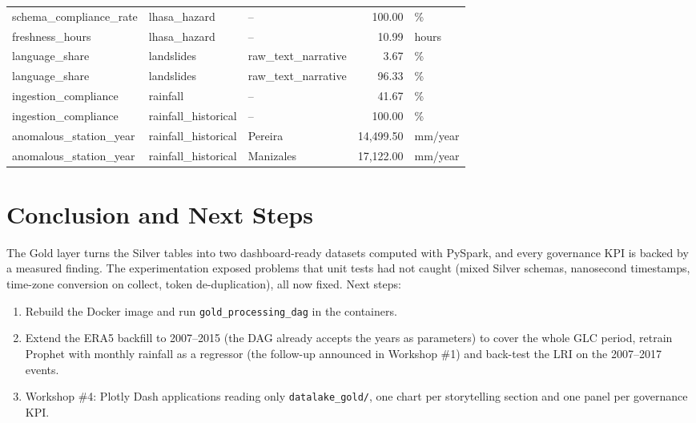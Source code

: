 \documentclass[11pt,a4paper]{article}
\begin{document}
\begin{longtable}{p{4.0cm}p{3.0cm}p{3.8cm}rp{1.4cm}}
schema\_compliance\_rate & lhasa\_hazard & -- & 100.00 & \% \\
freshness\_hours & lhasa\_hazard & -- & 10.99 & hours \\
language\_share & landslides & raw\_text\_narrative & 3.67 & \% \\
language\_share & landslides & raw\_text\_narrative & 96.33 & \% \\
ingestion\_compliance & rainfall & -- & 41.67 & \% \\
ingestion\_compliance & rainfall\_historical & -- & 100.00 & \% \\
anomalous\_station\_year & rainfall\_historical & Pereira & 14,499.50 & mm/year \\
anomalous\_station\_year & rainfall\_historical & Manizales & 17,122.00 & mm/year \\
\bottomrule\end{longtable}

\section{Conclusion and Next Steps}
The Gold layer turns the Silver tables into two dashboard-ready datasets computed with PySpark, and every governance KPI
is backed by a measured finding. The experimentation exposed problems that unit tests had not caught (mixed Silver
schemas, nanosecond timestamps, time-zone conversion on collect, token de-duplication), all now fixed. Next steps:
\begin{enumerate}
\item Rebuild the Docker image and run \texttt{gold\_\allowbreak{}processing\_\allowbreak{}dag} in the containers.
\item Extend the ERA5 backfill to 2007--2015 (the DAG already accepts the years as parameters) to cover the whole GLC
period, retrain Prophet with monthly rainfall as a regressor (the follow-up announced in Workshop \#1) and back-test the
LRI on the 2007--2017 events.
\item Workshop \#4: Plotly Dash applications reading only \texttt{datalake\_\allowbreak{}gold/\allowbreak{}}, one chart per storytelling section and one
panel per governance KPI.
\end{enumerate}
\end{document}
